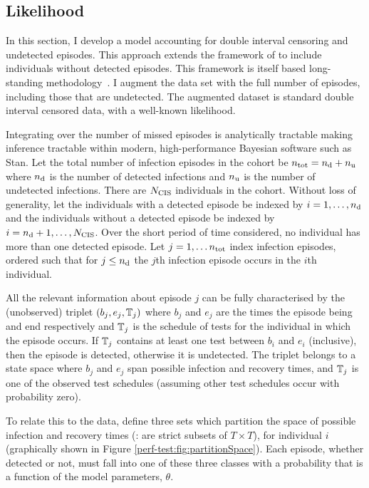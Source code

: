 \documentclass[thesis.tex]{subfiles}
\begin{document}
\subsection{Likelihood}\label{perf-test:sec:likelihood}

In this section, I develop a model accounting for double interval censoring and undetected episodes.
This approach extends the framework of \textcite{heiseyModelling} to include individuals without detected episodes.
This framework is itself based long-standing methodology~\autocites{dempsterMaximum}{turnbullEmpirical}.
I augment the data set with the full number of episodes, including those that are undetected.
The augmented dataset is standard double interval censored data, with a well-known likelihood.

Integrating over the number of missed episodes is analytically tractable making inference tractable within modern, high-performance Bayesian software such as Stan.
Let the total number of infection episodes in the cohort be $n_\text{tot} = n_\text{d} + n_\text{u}$ where $n_\text{d}$ is the number of detected infections and $n_\text{u}$ is the number of undetected infections.
There are $N_\text{CIS}$ individuals in the cohort.
Without loss of generality, let the individuals with a detected episode be indexed by $i = 1, \dots, n_\text{d}$ and the individuals without a detected episode be indexed by $i = n_\text{d} + 1, \dots, N_\text{CIS}$.
Over the short period of time considered, no individual has more than one detected episode. 
Let $j = 1, \dots n_\text{tot}$ index infection episodes, ordered such that for $j \leq n_\text{d}$ the $j$th infection episode occurs in the $i$th individual.

All the relevant information about episode $j$ can be fully characterised by the (unobserved) triplet $(b_j, e_j, \mathbb{T}_j)$ where $b_j$ and $e_j$ are the times the episode being and end respectively and $\mathbb{T}_j$ is the schedule of tests for the individual in which the episode occurs. 
If $\mathbb{T}_j$ contains at least one test between $b_i$ and $e_i$ (inclusive), then the episode is detected, otherwise it is undetected.
The triplet belongs to a state space where $b_j$ and $e_j$ span possible infection and recovery times, and $\mathbb{T}_j$ is one of the observed test schedules (assuming other test schedules occur with probability zero).

To relate this to the data, define three sets which partition the space of possible infection and recovery times (\ie: are strict subsets of $T \times T$), for individual $i$ (graphically shown in Figure \ref{perf-test:fig:partitionSpace}).
Each episode, whether detected or not, must fall into one of these three classes with a probability that is a function of the model parameters, $\theta$.
\end{document}
